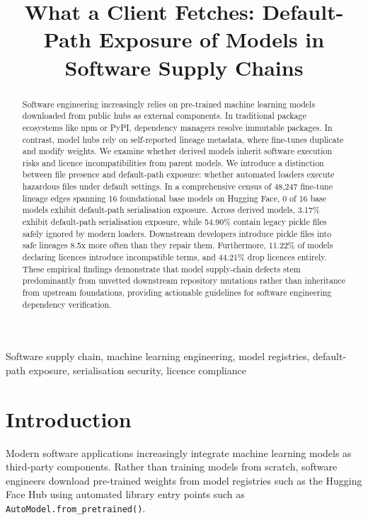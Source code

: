\documentclass[conference]{IEEEtran}
\begin{document}
\title{What a Client Fetches: Default-Path Exposure of Models in Software Supply Chains}

\author{
}

\maketitle

\begin{abstract}
Software engineering increasingly relies on pre-trained machine learning models downloaded from public hubs as external components. In traditional package ecosystems like npm or PyPI, dependency managers resolve immutable packages. In contrast, model hubs rely on self-reported lineage metadata, where fine-tunes duplicate and modify weights. We examine whether derived models inherit software execution risks and licence incompatibilities from parent models. We introduce a distinction between file presence and default-path exposure: whether automated loaders execute hazardous files under default settings. In a comprehensive census of 48,247 fine-tune lineage edges spanning 16 foundational base models on Hugging Face, 0 of 16 base models exhibit default-path serialisation exposure. Across derived models, 3.17\% exhibit default-path serialisation exposure, while 54.90\% contain legacy pickle files safely ignored by modern loaders. Downstream developers introduce pickle files into safe lineages 8.5x more often than they repair them. Furthermore, 11.22\% of models declaring licences introduce incompatible terms, and 44.21\% drop licences entirely. These empirical findings demonstrate that model supply-chain defects stem predominantly from unvetted downstream repository mutations rather than inheritance from upstream foundations, providing actionable guidelines for software engineering dependency verification.
\end{abstract}

\begin{IEEEkeywords}
Software supply chain, machine learning engineering, model registries, default-path exposure, serialisation security, licence compliance
\end{IEEEkeywords}

\section{Introduction}
Modern software applications increasingly integrate machine learning models as third-party components. Rather than training models from scratch, software engineers download pre-trained weights from model registries such as the Hugging Face Hub using automated library entry points such as \texttt{AutoModel.from\_pretrained()}. 
\end{document}

